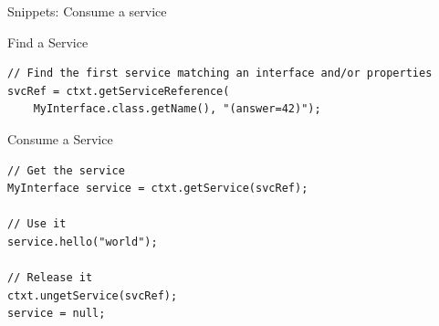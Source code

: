 \begin{frame}[fragile]{Snippets: Consume a service}
\begin{small}
\begin{block}{Find a Service}
\begin{verbatim}
// Find the first service matching an interface and/or properties
svcRef = ctxt.getServiceReference(
	MyInterface.class.getName(), "(answer=42)");
\end{verbatim}
\vspace{-.8em}
\end{block}

\begin{block}{Consume a Service}
\begin{verbatim}
// Get the service
MyInterface service = ctxt.getService(svcRef);

// Use it
service.hello("world");

// Release it
ctxt.ungetService(svcRef);
service = null;
\end{verbatim}
\vspace{-.8em}
\end{block}
\end{small}
\end{frame}

